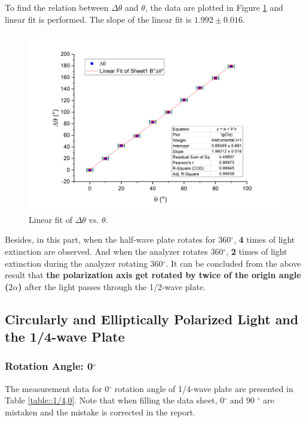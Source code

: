 \documentclass[a4paper]{article}
\begin{document}
To find the relation between $\Delta\theta$ and $\theta$, the data are plotted in Figure \ref{fig::delta} and linear fit is performed. The slope of the linear fit is $1.992 \pm 0.016$.

\begin{figure}[H]
	\centering
	\includegraphics[scale=0.5]{delta.png}
	\caption{Linear fit of $\Delta\theta$ vs. $\theta$.}
	\label{fig::delta}
\end{figure}


Besides, in this part, when the half-wave plate rotates for 360$^\circ$, \textbf{4} times of light extinction are observed. And when the analyzer rotates 360$^\circ$,
\textbf{2} times of light extinction during the analyzer rotating 360$^\circ$. It can be concluded from the above result that
\textbf{the polarization axis get rotated by twice of the origin angle ($2\alpha$)} after the light passes through the 1/2-wave plate.

\subsection{Circularly and Elliptically Polarized Light and the 1/4-wave Plate}

\subsubsection{Rotation Angle: 0$^\circ$} \label{sec:0degree}

The measurement data for 0$^\circ$ rotation angle of 1/4-wave plate are presented in Table \ref{table::1/4,0}. Note that when filling the data sheet, 0$^\circ$ and 90 $^\circ$ are mistaken and the mistake is corrected in the report.
\end{document}
